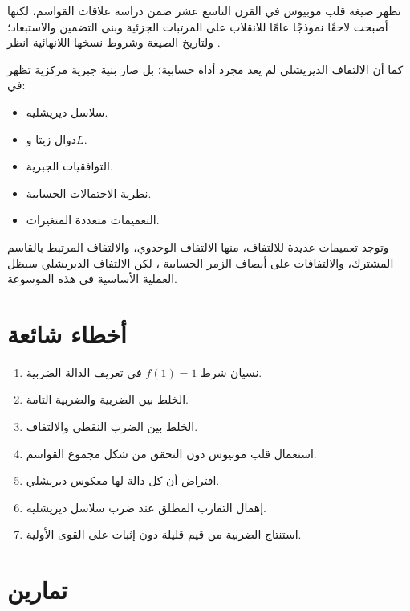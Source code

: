 تظهر صيغة قلب موبيوس في القرن التاسع عشر ضمن دراسة علاقات القواسم، لكنها
أصبحت لاحقًا نموذجًا عامًا للانقلاب على المرتبات الجزئية وبنى التضمين
والاستبعاد؛ ولتاريخ الصيغة وشروط نسخها اللانهائية انظر
\cite{LoxtonSanders1980}.

كما أن الالتفاف الديريشلي لم يعد مجرد أداة حسابية؛ بل صار بنية جبرية مركزية تظهر في:

\begin{itemize}
  \item سلاسل ديريشليه.
  \item دوال زيتا و\(L\).
  \item التوافقيات الجبرية.
  \item نظرية الاحتمالات الحسابية.
  \item التعميمات متعددة المتغيرات.
\end{itemize}

وتوجد تعميمات عديدة للالتفاف، منها الالتفاف الوحدوي، والالتفاف المرتبط
بالقاسم المشترك، والالتفافات على أنصاف الزمر الحسابية
\cite{Toth2013,Shapiro1972}، لكن الالتفاف الديريشلي سيظل العملية الأساسية
في هذه الموسوعة.

\section{أخطاء شائعة}

\begin{enumerate}
  \item نسيان شرط \(f(1)=1\) في تعريف الدالة الضربية.
  \item الخلط بين الضربية والضربية التامة.
  \item الخلط بين الضرب النقطي والالتفاف.
  \item استعمال قلب موبيوس دون التحقق من شكل مجموع القواسم.
  \item افتراض أن كل دالة لها معكوس ديريشلي.
  \item إهمال التقارب المطلق عند ضرب سلاسل ديريشليه.
  \item استنتاج الضربية من قيم قليلة دون إثبات على القوى الأولية.
\end{enumerate}

\section{تمارين}

